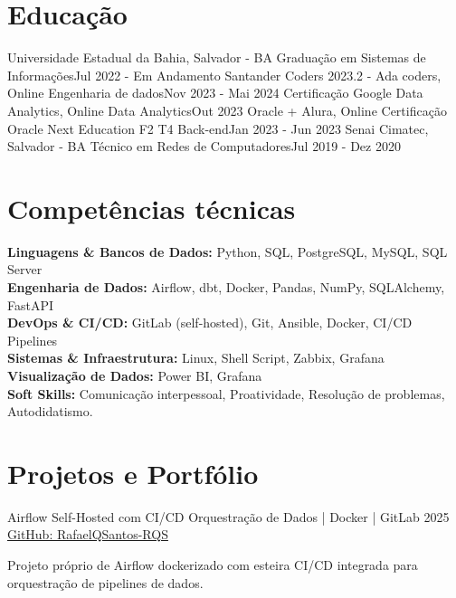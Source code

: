 \section{\textbf{Educação}}
\resumeSubHeadingListStart
\resumeSubheading
{Universidade Estadual da Bahia, Salvador - BA}{}
{Graduação em Sistemas de Informações}{Jul 2022 - Em Andamento}
\resumeSubheading
{Santander Coders 2023.2 - Ada coders, Online}{}
{Engenharia de dados}{Nov 2023 - Mai 2024}
\resumeSubheading
{Certificação Google Data Analytics, Online}{}
{Data Analytics}{Out 2023}
\resumeSubheading
{Oracle + Alura, Online}{}
{Certificação Oracle Next Education F2 T4 Back-end}{Jan 2023 - Jun 2023}
\resumeSubheading
{Senai Cimatec, Salvador - BA}{}
{Técnico em Redes de Computadores}{Jul 2019 - Dez 2020}
\resumeSubHeadingListEnd
\vspace{-5.5mm}

\section{\textbf{Competências técnicas}}
\begin{itemize}[leftmargin=0.1in, label={}]
	\small{\item{
	      \textbf{Linguagens \& Bancos de Dados:}{ Python, SQL, PostgreSQL, MySQL, SQL Server} \\
	      \textbf{Engenharia de Dados:}{ Airflow, dbt, Docker, Pandas, NumPy, SQLAlchemy, FastAPI} \\
	      \textbf{DevOps \& CI/CD:}{ GitLab (self-hosted), Git, Ansible, Docker, CI/CD Pipelines} \\
	      \textbf{Sistemas \& Infraestrutura:}{ Linux, Shell Script, Zabbix, Grafana} \\
	      \textbf{Visualização de Dados:}{ Power BI, Grafana} \\
	      \textbf{Soft Skills:}{ Comunicação interpessoal, Proatividade, Resolução de problemas, Autodidatismo.} \\
	      }}
\end{itemize}
\vspace{-16pt}


\section{\textbf{Projetos e Portfólio}}
\resumeSubHeadingListStart
\resumeProject
{Airflow Self-Hosted com CI/CD}
{Orquestração de Dados | Docker | GitLab}
{2025}
{\href{https://github.com/RafaelQSantos-RQS}{GitHub: RafaelQSantos-RQS}}
\resumeItemListStart
\item {Projeto próprio de Airflow dockerizado com esteira CI/CD integrada para orquestração de pipelines de dados.}
\resumeItemListEnd

